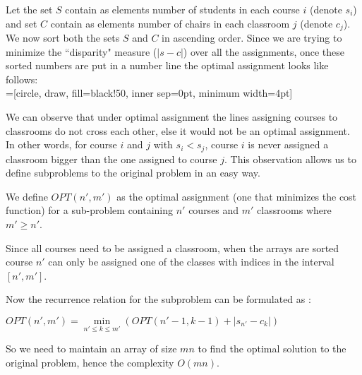 Let the set $S$ contain as elements number of students in each course $i$ (denote $s_i$) and set $C$ contain as elements number of chairs in each classroom $j$ (denote $c_j$). We now sort both the sets $S$ and $C$ in ascending order. Since we are trying to minimize the ``disparity" measure ($|s - c|$) over all the assignments, once these sorted numbers are put in a number line the optimal assignment looks like follows: \\



=[circle, draw, fill=black!50,
                        inner sep=0pt, minimum width=4pt]
\quad



We can observe that under optimal assignment the lines assigning courses to classrooms do not cross each other, else it would not be an optimal assignment. In other words, for course $i$ and $j$ with $s_i < s_j$, course $i$ is never assigned a classroom bigger than the one assigned to course $j$. This observation allows us to define subproblems to the original problem in an easy way.

We define $OPT(n', m')$ as the optimal assignment (one that minimizes the cost function) for a sub-problem containing $n'$ courses and $m'$ classrooms where $m' \geq n'$.



Since all courses need to be assigned a classroom, when the arrays are sorted course $n'$ can only be assigned one of the classes with indices in the interval $[n', m']$.

Now the recurrence relation for the subproblem can be formulated as :

\begin{center}
	$OPT(n', m') = \min\limits_{n'\leq k \leq m'} (OPT(n'-1, k-1) + |s_{n'} - c_{k}|)$
\end{center}

So we need to maintain an array of size $mn$ to find the optimal solution to the original problem, hence the  complexity $O(mn)$.



